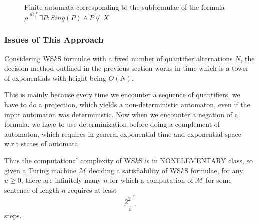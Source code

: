 \begin{figure}[h!]
\begin{center}
 \end{center}
 \caption{Finite automata corresponding to the subformulae of the formula
 $\rho \overset{\mathit{def}}{=} \exists P:
 Sing(P) \wedge P \not\subseteq X$}\label{automata}
\end{figure}

\subsubsection{Issues of This Approach}

Considering WS$k$S formulae with a fixed number of quantifier alternations $N$,
the decision method outlined in the previous section works in time which is a
tower of exponentials with height being $O(N)$.

This is mainly because every time we encounter a sequence of quantifiers, we
have to do a projection, which yields a non-deterministic automaton, even if the
input automaton was deterministic. Now when we encounter a negation of a
formula, we have to use determinization before doing a complement of automaton,
which requires in general exponential time and exponential space w.r.t states of
automata.

Thus the computational complexity of WS$k$S is in NONELEMENTARY class, so given
a Turing machine $\mathcal{M}$ deciding a satisfiability of WS$k$S formulae, for
any $u \geq 0$, there are infinitely many $n$ for which a computation of
$\mathcal{M}$ for some sentence of length $n$ requires at least
$$\underbrace{2^{2^{\iddots^{2^n}}}}_u$$ steps.
	
